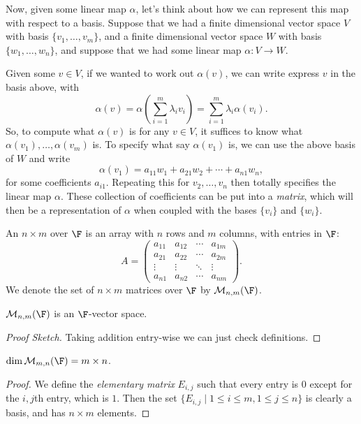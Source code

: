 Now, given some linear map $\alpha$, let's think about how we can represent this map with respect to a basis.
Suppose that we had a finite dimensional vector space $V$ with basis $\{v_1, \dots, v_m\}$, and a finite dimensional vector space $W$ with basis $\{w_1, \dots, w_n\}$, and suppose that we had some linear map $\alpha : V \rightarrow W$.

Given some $v \in V$, if we wanted to work out $\alpha(v)$, we can write express $v$ in the basis above, with
$$
\alpha(v) = \alpha\left(\sum_{i = 1}^m \lambda_i v_i\right) = \sum_{i = 1}^m \lambda_i \alpha(v_i).
$$
So, to compute what $\alpha(v)$ is for any $v \in V$, it suffices to know what $\alpha(v_1), \dots, \alpha(v_m)$ is. To specify what say $\alpha(v_1)$ is, we can use the above basis of $W$ and write
$$
\alpha(v_1) = a_{11} w_1 + a_{21} w_2 + \cdots + a_{n1} w_n,
$$
for some coefficients $a_{i1}$. Repeating this for $v_2, \dots, v_n$ then totally specifies the linear map $\alpha$.
These collection of coefficients can be put into a \emph{matrix}, which will then be a representation of $\alpha$ when coupled with the bases $\{v_i\}$ and $\{w_i\}$.


\begin{definition}[Matrix]
    An $n \times m$  over $\F$ is an array with $n$ rows and $m$ columns, with entries in $\F$:
    $$
    A = \begin{pmatrix}
        a_{11} & a_{12} & \cdots & a_{1m} \\
        a_{21} & a_{22} & \cdots & a_{2m} \\
        \vdots&\vdots&\ddots &\vdots\\
        a_{n1} & a_{n2} & \cdots & a_{nm}
    \end{pmatrix}.
    $$
    We denote the set of $n \times m$ matrices over $\F$ by $\mathcal{M}_{n,m}(\F)$.
\end{definition}

\begin{proposition}
    $\mathcal{M}_{n, m}(\F)$ is an $\F$-vector space.
\end{proposition}
\begin{proof}[Proof Sketch]
    Taking addition entry-wise we can just check definitions.
\end{proof}

\begin{proposition}
    $\dim \mathcal{M}_{m, n}(\F) = m \times n$.
\end{proposition}
\begin{proof}
    We define the \emph{elementary matrix} $E_{i, j}$ such that every entry is $0$ except for the $i, j$th entry, which is $1$.
    Then the set $\{E_{i, j} \mid 1 \leq i \leq m, 1 \leq j \leq n\}$ is clearly a basis, and has $n \times m$ elements.
\end{proof}


